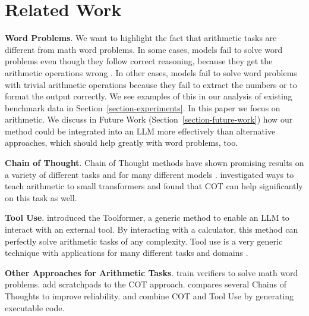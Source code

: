 \documentclass[11pt]{article}
\begin{document}
\section{Related Work}



\textbf{Word Problems}.
We want to highlight the fact that arithmetic tasks are different from math word problems.
In some cases, models fail to solve word problems even though they follow correct reasoning, because they get the arithmetic operations wrong \citep{schick2023toolformerlanguagemodelsteach,cobbe2021gsm8k,gao2023pal}.
In other cases, models fail to solve word problems with trivial arithmetic operations because they fail to extract the numbers or to format the output correctly. We see examples of this in our analysis of existing benchmark data in Section~\ref{section-experiments}.
In this paper we focus on arithmetic. We discuss in Future Work (Section~\ref{section-future-work}) how our method could be integrated into an LLM more effectively than alternative approaches, which should help greatly with word problems, too.


\textbf{Chain of Thought}.
Chain of Thought methods have shown promising results on a variety of different tasks and for many different models \citep{nye2021show,chung2024scaling}.
\citet{lee2023teachingarithmeticsmalltransformers} investigated ways to teach arithmetic to small transformers and found that COT can help significantly on this task as well.


\textbf{Tool Use}.
\citet{schick2023toolformerlanguagemodelsteach} introduced the Toolformer, a generic method to enable an LLM to interact with an external tool. By interacting with a calculator, this method can perfectly solve arithmetic tasks of any complexity.
Tool use is a very generic technique with applications for many different tasks and domains \citep{qu2024tool}.


\textbf{Other Approaches for Arithmetic Tasks}.
\citet{cobbe2021gsm8k} train verifiers to solve math word problems.
\citet{nye2021show} add scratchpads to the COT approach.
\citet{imani2023mathpromptermathematicalreasoningusing} compares several Chains of Thoughts to improve reliability.
\citet{chen2022program} and \citet{gao2023pal} combine COT and Tool Use by generating executable code.
\end{document}
